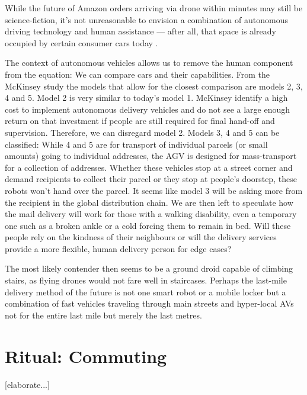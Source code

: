 \documentclass[12pt, usenames, dvipsnames]{report}
\begin{document}
\begin{flushleft}
While the future of Amazon orders arriving via drone within minutes may still be science-fiction, it's not unreasonable to envision a combination of autonomous driving technology and human assistance --- after all, that space is already occupied by certain consumer cars today \cite{mcfarland2020}.

The context of autonomous vehicles allows us to remove the human component from the equation:
We can compare cars and their capabilities. 
From the McKinsey study \cite{mckinsey2016} the models that allow for the closest comparison are models 2, 3, 4 and 5.
Model 2 is very similar to today's model 1.
McKinsey identify a high cost to implement autonomous delivery vehicles and do not see a large enough return on that investment if people are still required for final hand-off and supervision.
Therefore, we can disregard model 2.
Models 3, 4 and 5 can be classified:
While 4 and 5 are for transport of individual parcels (or small amounts) going to individual addresses, the AGV is designed for mass-transport for a collection of addresses.
Whether these vehicles stop at a street corner and demand recipients to collect their parcel or they stop at people's doorstep, these robots won't hand over the parcel.
It seems like model 3 will be asking more from the recipient in the global distribution chain.
We are then left to speculate how the mail delivery will work for those with a walking disability, even a temporary one such as a broken ankle or a cold forcing them to remain in bed.
Will these people rely on the kindness of their neighbours or will the delivery services provide a more flexible, human delivery person for edge cases?

The most likely contender then seems to be a ground droid capable of climbing stairs, as flying drones would not fare well in staircases.
Perhaps the last-mile delivery method of the future is not one smart robot or a mobile locker but a combination of fast vehicles traveling through main streets and hyper-local AVs not for the entire last mile but merely the last metres. 


\section{Ritual: Commuting}

[elaborate...]



\end{flushleft}
\end{document}
